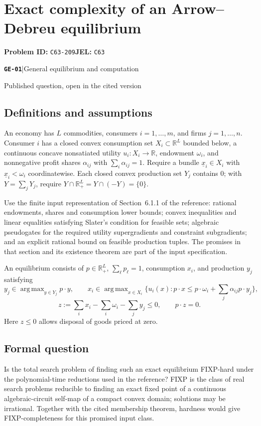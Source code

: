 \documentclass[11pt,a4paper]{article}
\newcommand{\R}{\mathbb R}
\DeclareMathOperator*{\argmax}{arg\,max}
\newcommand{\entrymeta}[3]{{\sffamily\small\color{muted}\textbf{\texttt{#1}}\quad|\quad #2\par #3\par}}
\begin{document}
\section*{Exact complexity of an Arrow--Debreu equilibrium}
\textbf{Problem ID:} \texttt{C63-209}\quad \textbf{JEL:} \texttt{C63}\par
\label{problem:OP-0573}
\label{beyond:GE-01}
\entrymeta{GE-01}{General equilibrium and computation}{Published question, open in the cited version}
\subsection*{Definitions and assumptions}
An economy has $L$ commodities, consumers $i=1,\ldots,m$, and firms $j=1,\ldots,n$. Consumer $i$ has a closed convex consumption set $X_i\subset\R^L$ bounded below, a continuous concave nonsatiated utility $u_i:X_i\to\R$, endowment $\omega_i$, and nonnegative profit shares $\alpha_{ij}$ with $\sum_i\alpha_{ij}=1$. Require a bundle $\underline x_i\in X_i$ with $\underline x_i<\omega_i$ coordinatewise. Each closed convex production set $Y_j$ contains $0$; with $Y=\sum_jY_j$, require $Y\cap\R^L_+=Y\cap(-Y)=\{0\}$.

Use the finite input representation of Section~6.1.1 of the reference: rational endowments, shares and consumption lower bounds; convex inequalities and linear equalities satisfying Slater's condition for feasible sets; algebraic pseudogates for the required utility supergradients and constraint subgradients; and an explicit rational bound on feasible production tuples. The promises in that section and its existence theorem are part of the input specification.

An equilibrium consists of $p\in\R^L_+$, $\sum_\ell p_\ell=1$, consumption $x_i$, and production $y_j$ satisfying
\[
 y_j\in\argmax_{y\in Y_j}p\cdot y,\qquad
 x_i\in\argmax_{x\in X_i}\{u_i(x):p\cdot x\le p\cdot\omega_i+\textstyle\sum_j\alpha_{ij}p\cdot y_j\},
\]
\[
 z:=\sum_ix_i-\sum_i\omega_i-\sum_jy_j\le0,\qquad p\cdot z=0.
\]
Here $z\le0$ allows disposal of goods priced at zero.
\subsection*{Formal question}
Is the total search problem of finding such an exact equilibrium FIXP-hard under the polynomial-time reductions used in the reference? FIXP is the class of real search problems reducible to finding an exact fixed point of a continuous algebraic-circuit self-map of a compact convex domain; solutions may be irrational. Together with the cited membership theorem, hardness would give FIXP-completeness for this promised input class.
\end{document}
